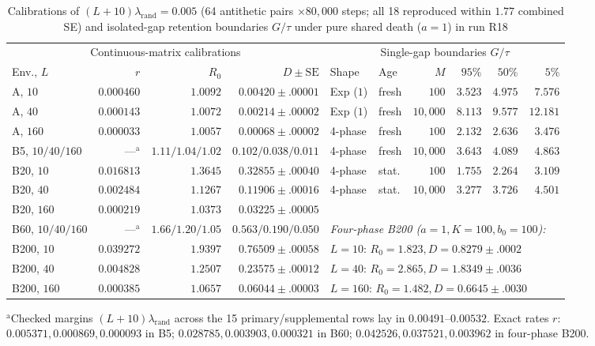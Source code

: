\begin{table}[htbp]\centering\scriptsize
\setlength{\tabcolsep}{2.2pt}
\caption{Calibrations of $(L + 10)\lambda_{\mathrm{rand}} = 0.005$ (64 antithetic pairs $\times 80{,}000$ steps; all 18 reproduced within $1.77$ combined SE) and isolated-gap retention boundaries $G/\tau$ under pure shared death ($a = 1$) in run R18}\label{num-esm-tab-r18-cal}\label{num-esm-tab-r18-gap}
\begin{tabular}{lrrr|llrrrr}\toprule
\multicolumn{4}{c|}{Continuous-matrix calibrations} & \multicolumn{6}{c}{Single-gap boundaries $G/\tau$}\\
Env., $L$ & $r$ & $R_0$ & $D \pm \mathrm{SE}$ & Shape & Age & $M$ & $95\%$ & $50\%$ & $5\%$\\\midrule
A, $10$ & $0.000460$ & $1.0092$ & $0.00420 \pm .00001$ & Exp ($1$) & fresh & $100$ & $3.523$ & $4.975$ & $7.576$\\
A, $40$ & $0.000143$ & $1.0072$ & $0.00214 \pm .00002$ & Exp ($1$) & fresh & $10{,}000$ & $8.113$ & $9.577$ & $12.181$\\
A, $160$ & $0.000033$ & $1.0057$ & $0.00068 \pm .00002$ & 4-phase & fresh & $100$ & $2.132$ & $2.636$ & $3.476$\\
B5, $10 / 40 / 160$ & ---$^{\mathrm{a}}$ & $1.11 / 1.04 / 1.02$ & $0.102 / 0.038 / 0.011$ & 4-phase & fresh & $10{,}000$ & $3.643$ & $4.089$ & $4.863$\\
B20, $10$ & $0.016813$ & $1.3645$ & $0.32855 \pm .00040$ & 4-phase & stat. & $100$ & $1.755$ & $2.264$ & $3.109$\\
B20, $40$ & $0.002484$ & $1.1267$ & $0.11906 \pm .00016$ & 4-phase & stat. & $10{,}000$ & $3.277$ & $3.726$ & $4.501$\\
B20, $160$ & $0.000219$ & $1.0373$ & $0.03225 \pm .00005$ & \multicolumn{6}{l}{}\\
B60, $10 / 40 / 160$ & ---$^{\mathrm{a}}$ & $1.66 / 1.20 / 1.05$ & $0.563 / 0.190 / 0.050$ & \multicolumn{6}{l}{\emph{Four-phase B200 ($a=1, K=100, b_0=100$):}}\\
B200, $10$ & $0.039272$ & $1.9397$ & $0.76509 \pm .00058$ & \multicolumn{6}{l}{$L=10$: $R_0=1.823, D=0.8279 \pm .0002$}\\
B200, $40$ & $0.004828$ & $1.2507$ & $0.23575 \pm .00012$ & \multicolumn{6}{l}{$L=40$: $R_0=2.865, D=1.8349 \pm .0036$}\\
B200, $160$ & $0.000385$ & $1.0657$ & $0.06044 \pm .00003$ & \multicolumn{6}{l}{$L=160$: $R_0=1.482, D=0.6645 \pm .0030$}\\\bottomrule
\end{tabular}
\par\smallskip\raggedright\footnotesize
$^{\mathrm{a}}$Checked margins $(L+10)\lambda_{\mathrm{rand}}$ across the 15 primary/supplemental rows lay in $0.00491$--$0.00532$. Exact rates $r$: $0.005371, 0.000869, 0.000093$ in B5; $0.028785, 0.003903, 0.000321$ in B60; $0.042526, 0.037521, 0.003962$ in four-phase B200.
\end{table}

